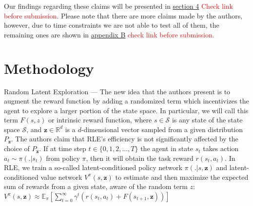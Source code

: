 \documentclass[10pt]{article} %
\begin{document}
\noindent Our findings regarding these claims will be presented in \hyperlink{sec4}{section 4} \textcolor{red}{Check link before submission}. Please note that there are more claims made by the authors, however, due to time constraints we are not able to test all of them, the remaining ones are shown in \hyperlink{untested-claims}{appendix B} \textcolor{red}{check link before submission.}

\section{Methodology}
Random Latent Exploration --- The new idea that the authors \cite{rle-paper} present is to augment the reward function by adding a randomized term which incentivizes the agent to explore a larger portion of the state space. In particular, we will call this term $F(s, z)$ or intrinsic reward function, where $s \in \mathcal{S}$ is any state of the state space $\mathcal{S}$, and $\textbf{z} \in \mathbb{R}^{d}$ is a $d$-dimensional vector sampled from a given distribution $P_{\textbf{z}}$. The authors \cite{rle-paper} claim that RLE's efficiency is not significantly affected by the choice of $P_{\textbf{z}}$. If at time step $t \in \{0, 1, 2, ..., T\}$ the agent in state $s_{t}$ takes action $a_{t} \sim \pi(. | s_{t})$ from policy $\pi$, then it will obtain the task reward $r (s_{t}, a_{t})$. In RLE, we train a so-called latent-conditioned policy network $\pi(. | s, \textbf{z})$ and latent-conditioned value network $V^{\pi}(s, \textbf{z})$ to estimate and then maximize the expected sum of rewards from a given state, aware of the random term $z$: $V^{\pi}(s, \textbf{z}) \approx \mathbb{E}_{\pi} \left[\sum_{t = 0}^{\infty} \gamma^{t} \left(r(s_{t}, a_{t}) + F(s_{t+1}, \textbf{z})\right) \right]$
\end{document}
